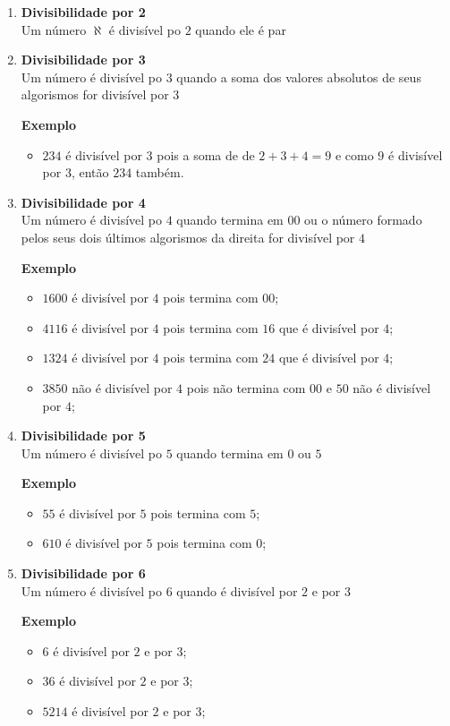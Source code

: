 \begin{enumerate}
	\item \textbf{Divisibilidade por 2} \\
	Um número \textbf{$\aleph$} é divisível po $2$ quando ele é par

\item \textbf{Divisibilidade por 3} \\
Um número é divisível po $3$ quando a soma dos valores absolutos de seus algorismos for divisível por $3$

\textbf{Exemplo}
	\begin{itemize}
		\item $234$ é divisível por $3$ pois a soma de de $2+3+4 = 9$ e como $9$ é divisível por $3$, então $234$ também. 
	\end{itemize} 

\item \textbf{Divisibilidade por 4} \\
Um número é divisível po $4$ quando termina em $00$ ou o número formado pelos seus dois últimos algorismos da direita for divisível por $4$

	\textbf{Exemplo}
	\begin{itemize}
		\item $1600$ é divisível por $4$ pois termina com $00$;
		\item $4116$ é divisível por $4$ pois termina com $16$ que é divisível por $4$;
		\item $1324$ é divisível por $4$ pois termina com $24$ que é divisível por $4$;
		\item $3850$ não é divisível por $4$ pois não termina com $00$ e $50$ não é divisível por $4$;
	\end{itemize}

\item \textbf{Divisibilidade por 5} \\
Um número é divisível po $5$ quando termina em $0$ ou $5$

\textbf{Exemplo}
\begin{itemize}
	\item $55$ é divisível por $5$ pois termina com $5$;
	\item $610$ é divisível por $5$ pois termina com $0$;
\end{itemize}

\item \textbf{Divisibilidade por 6} \\
Um número é divisível po $6$ quando é divisível por $2$ e por $3$

\textbf{Exemplo}
\begin{itemize}
	\item $6$ é divisível por $2$ e por $3$;
	\item $36$ é divisível por $2$ e por $3$;
	\item $5214$ é divisível por $2$ e por $3$;
\end{itemize}

\end{enumerate}

